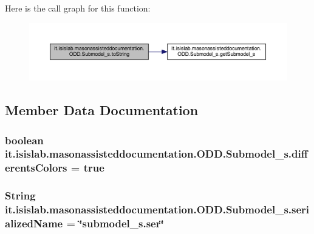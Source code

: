 Here is the call graph for this function\-:
\nopagebreak
\begin{figure}[H]
\begin{center}
\leavevmode
\includegraphics[width=350pt]{classit_1_1isislab_1_1masonassisteddocumentation_1_1_o_d_d_1_1_submodel__s_aaef6a78efd50526e52b6fb83b4222f11_cgraph}
\end{center}
\end{figure}




\subsection{Member Data Documentation}
\hypertarget{classit_1_1isislab_1_1masonassisteddocumentation_1_1_o_d_d_1_1_submodel__s_adfe49ada88df75cac690d3cdd91b4c9d}{
\subsubsection[{differents\-Colors}]{\setlength{\rightskip}{0pt plus 5cm}boolean it.\-isislab.\-masonassisteddocumentation.\-O\-D\-D.\-Submodel\-\_\-s.\-differents\-Colors = true\hspace{0.3cm}{\ttfamily [static]}}}\label{classit_1_1isislab_1_1masonassisteddocumentation_1_1_o_d_d_1_1_submodel__s_adfe49ada88df75cac690d3cdd91b4c9d}
\hypertarget{classit_1_1isislab_1_1masonassisteddocumentation_1_1_o_d_d_1_1_submodel__s_a7b9cf4ddeacb2ad2206a2e309ebd297b}{
\subsubsection[{serialized\-Name}]{\setlength{\rightskip}{0pt plus 5cm}String it.\-isislab.\-masonassisteddocumentation.\-O\-D\-D.\-Submodel\-\_\-s.\-serialized\-Name = \char`\"{}submodel\-\_\-s.\-ser\char`\"{}\hspace{0.3cm}{\ttfamily [static]}}}\label{classit_1_1isislab_1_1masonassisteddocumentation_1_1_o_d_d_1_1_submodel__s_a7b9cf4ddeacb2ad2206a2e309ebd297b}
